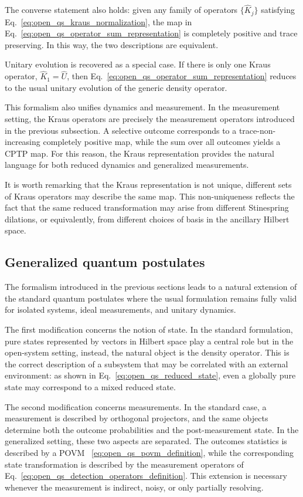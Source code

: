 The converse statement also holds: given any family of operators \(\{\hat K_j\}\) satisfying Eq.~\eqref{eq:open_qs_kraus_normalization}, the map in Eq.~\eqref{eq:open_qs_operator_sum_representation} is completely positive and trace preserving. In this way, the two descriptions are equivalent.

Unitary evolution is recovered as a special case. If there is only one Kraus operator, \(\hat K_1=\hat U\), then Eq.~\eqref{eq:open_qs_operator_sum_representation} reduces to the usual unitary evolution of the generic density operator.

This formalism also unifies dynamics and measurement. In the measurement setting, the Kraus operators are precisely the measurement operators introduced in the previous subsection. A selective outcome corresponds to a trace-non-increasing completely positive map, while the sum over all outcomes yields a CPTP map. For this reason, the Kraus representation provides the natural language for both reduced dynamics and generalized measurements.

It is worth remarking that the Kraus representation is not unique, different sets of Kraus operators may describe the same map. This non-uniqueness reflects the fact that the same reduced transformation may arise from different Stinespring dilations, or equivalently, from different choices of basis in the ancillary Hilbert space.

\subsection{Generalized quantum postulates}
\label{subsec:generalized_quantum_postulates}

The formalism introduced in the previous sections leads to a natural extension of the standard quantum postulates where the usual formulation remains fully valid for isolated systems, ideal measurements, and unitary dynamics.

The first modification concerns the notion of state. In the standard formulation, pure states represented by vectors in Hilbert space play a central role but in the open-system setting, instead, the natural object is the density operator. This is the correct description of a subsystem that may be correlated with an external environment: as shown in Eq.~\eqref{eq:open_qs_reduced_state}, even a globally pure state may correspond to a mixed reduced state.

The second modification concerns measurements. In the standard case, a measurement is described by orthogonal projectors, and the same objects determine both the outcome probabilities and the post-measurement state. In the generalized setting, these two aspects are separated. The outcomes statistics is described by a POVM ~\eqref{eq:open_qs_povm_definition}, while the corresponding state transformation is described by the measurement operators of Eq.~\eqref{eq:open_qs_detection_operators_definition}. This extension is necessary whenever the measurement is indirect, noisy, or only partially resolving.


